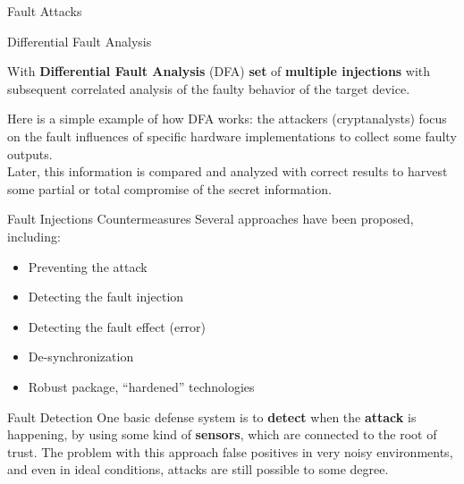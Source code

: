 \begin{chapter}{Fault Attacks}
  \begin{section}{ Differential Fault Analysis}

    \begin{boxH}
      With \textbf{Differential Fault Analysis} (DFA) \textbf{set} of \textbf{multiple injections}
      with subsequent correlated analysis of the faulty behavior of the target device.
    \end{boxH}
    Here is a simple example of how DFA works: the attackers (cryptanalysts) focus on the fault
    influences of specific hardware implementations to collect some faulty outputs.\\
      Later, this information is compared and analyzed with correct results to harvest some partial
      or total compromise of the secret information.
  \end{section}

  \begin{section}{Fault Injections Countermeasures}
    Several approaches have been proposed, including:
    \begin{itemize}
      \item Preventing the attack
      \item Detecting the fault injection
      \item Detecting the fault effect (error)
      \item De-synchronization
      \item Robust package, “hardened” technologies
    \end{itemize}

    \begin{subsection}{Fault Detection}
      One basic defense system is to \textbf{detect} when the \textbf{attack} is happening, by using
      some kind of \textbf{sensors}, which are connected to the root of trust. The problem with this
      approach false positives in very noisy environments, and even in ideal conditions, attacks are
      still possible to some degree.
    \end{subsection}


\end{section}
\end{chapter}
